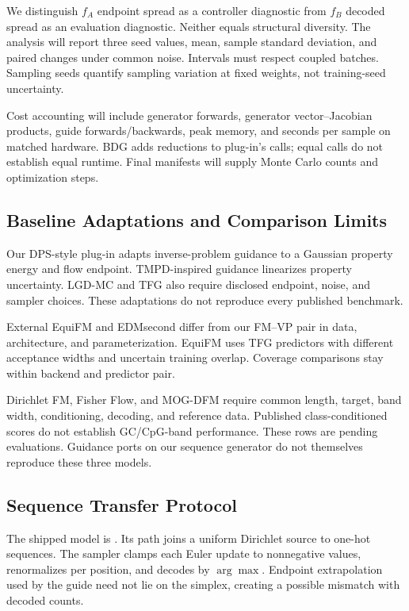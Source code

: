 \documentclass{article}
\begin{document}
We distinguish $f_A$ endpoint spread as a controller diagnostic from $f_B$ decoded spread as an evaluation diagnostic. Neither equals structural diversity. The analysis will report three seed values, mean, sample standard deviation, and paired changes under common noise. Intervals must respect coupled batches. Sampling seeds quantify sampling variation at fixed weights, not training-seed uncertainty.

Cost accounting will include generator forwards, generator vector--Jacobian products, guide forwards/backwards, peak memory, and seconds per sample on matched hardware. BDG adds reductions to plug-in's calls; equal calls do not establish equal runtime. Final manifests will supply Monte Carlo counts and optimization steps.

\subsection{Baseline Adaptations and Comparison Limits}\label{app:comparisons}
Our DPS-style plug-in adapts inverse-problem guidance to a Gaussian property energy and flow endpoint. TMPD-inspired guidance linearizes property uncertainty. LGD-MC and TFG also require disclosed endpoint, noise, and sampler choices. These adaptations do not reproduce every published benchmark.

External EquiFM and EDMsecond differ from our FM--VP pair in data, architecture, and parameterization. EquiFM uses TFG predictors with different acceptance widths and uncertain training overlap. Coverage comparisons stay within backend and predictor pair.

Dirichlet FM, Fisher Flow, and MOG-DFM require common length, target, band width, conditioning, decoding, and reference data. Published class-conditioned scores do not establish GC/CpG-band performance. These rows are pending evaluations. Guidance ports on our sequence generator do not themselves reproduce these three models.

\subsection{Sequence Transfer Protocol}\label{app:m2}
The shipped model is . Its path joins a uniform Dirichlet source to one-hot sequences. The sampler clamps each Euler update to nonnegative values, renormalizes per position, and decodes by $\arg\max$. Endpoint extrapolation used by the guide need not lie on the simplex, creating a possible mismatch with decoded counts.
\end{document}
